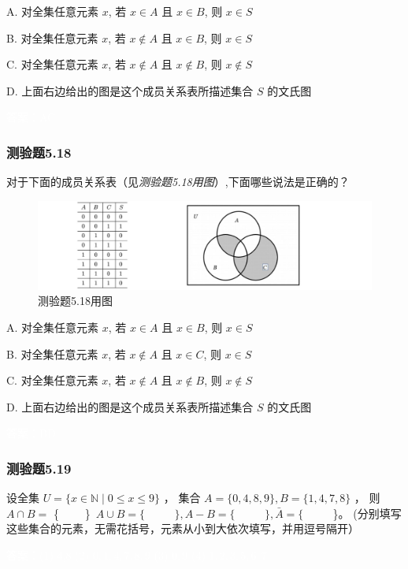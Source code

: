 \documentclass[UTF8, heading=true]{ctexart}
\begin{document}
A. 对全集任意元素 $x$, 若 $x \in A$ 且 $x \in B$, 则 $x \in S$

B. 对全集任意元素 $x$, 若 $x \notin A$ 且 $x \in B$, 则 $x \in S$

C. 对全集任意元素 $x$, 若 $x \notin A$ 且 $x \notin B$, 则 $x \notin S$

D. 上面右边给出的图是这个成员关系表所描述集合 $S$ 的文氏图

\textcolor{white}{答案：AC}


\subsubsection{测验题5.18}
对于下面的成员关系表（见\textit{测验题5.18用图}）,下面哪些说法是正确的？

\begin{figure}[H]
  \centering
  \includegraphics[width=1\textwidth]{5.18.jpg} %
  \caption{测验题5.18用图}
\end{figure}

A. 对全集任意元素 $x$, 若 $x \in A$ 且 $x \in B$, 则 $x \in S$

B. 对全集任意元素 $x$, 若 $x \notin A$ 且 $x \in C$, 则 $x \in S$

C. 对全集任意元素 $x$, 若 $x \notin A$ 且 $x \notin B$, 则 $x \notin S$

D. 上面右边给出的图是这个成员关系表所描述集合 $S$ 的文氏图



\textcolor{white}{答案：BD}

\subsubsection{测验题5.19}

设全集 $U=\{x \in \mathbb{N} \mid 0 \leq x \leq 9\}$ ，
集合 $A=\{0,4,8,9\}, B=\{1,4,7,8\}$ ，
则 $A \cap B=$ \{ $\qquad $\} $ \, A \cup B=\{$ $\qquad$ $\}, A-B=\{$ $\qquad$ $\}, \bar{A}=\{$ $\qquad$ \}。 (分别填写这些集合的元素，无需花括号，元素从小到大依次填写，并用逗号隔开）


\textcolor{white}{答案：(1) 4,8
(2) $0,1,4,7,8,9$
(3) $0,9$
(4) $1,2,3,5,6,7$}
\end{document}
